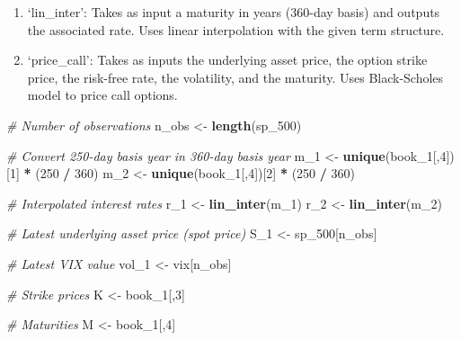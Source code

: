 \documentclass[]{article}
\newenvironment{Shaded}{\begin{snugshade}}{\end{snugshade}}
\newcommand{\CommentTok}[1]{\textcolor[rgb]{0.56,0.35,0.01}{\textit{#1}}}
\newcommand{\DecValTok}[1]{\textcolor[rgb]{0.00,0.00,0.81}{#1}}
\newcommand{\KeywordTok}[1]{\textcolor[rgb]{0.13,0.29,0.53}{\textbf{#1}}}
\newcommand{\NormalTok}[1]{#1}
\newcommand{\OperatorTok}[1]{\textcolor[rgb]{0.81,0.36,0.00}{\textbf{#1}}}
\newcommand{\StringTok}[1]{\textcolor[rgb]{0.31,0.60,0.02}{#1}}
\providecommand{\tightlist}{%
  \setlength{\itemsep}{0pt}\setlength{\parskip}{0pt}}
\begin{document}
\begin{enumerate}
\def\labelenumi{\arabic{enumi}.}
\tightlist
\item
  `lin\_inter': Takes as input a maturity in years (360-day basis) and
  outputs the associated rate. Uses linear interpolation with the given
  term structure.
\item
  `price\_call': Takes as inputs the underlying asset price, the option
  strike price, the risk-free rate, the volatility, and the maturity.
  Uses Black-Scholes model to price call options.
\end{enumerate}

\begin{Shaded}
\begin{Highlighting}[]
\CommentTok{# Number of observations}
\NormalTok{n_obs <-}\StringTok{ }\KeywordTok{length}\NormalTok{(sp_}\DecValTok{500}\NormalTok{)}

\CommentTok{# Convert 250-day basis year in 360-day basis year}
\NormalTok{m_}\DecValTok{1}\NormalTok{ <-}\StringTok{ }\KeywordTok{unique}\NormalTok{(book_}\DecValTok{1}\NormalTok{[,}\DecValTok{4}\NormalTok{])[}\DecValTok{1}\NormalTok{] }\OperatorTok{*}\StringTok{ }\NormalTok{(}\DecValTok{250} \OperatorTok{/}\StringTok{ }\DecValTok{360}\NormalTok{)}
\NormalTok{m_}\DecValTok{2}\NormalTok{ <-}\StringTok{ }\KeywordTok{unique}\NormalTok{(book_}\DecValTok{1}\NormalTok{[,}\DecValTok{4}\NormalTok{])[}\DecValTok{2}\NormalTok{] }\OperatorTok{*}\StringTok{ }\NormalTok{(}\DecValTok{250} \OperatorTok{/}\StringTok{ }\DecValTok{360}\NormalTok{)}

\CommentTok{# Interpolated interest rates}
\NormalTok{r_}\DecValTok{1}\NormalTok{ <-}\StringTok{ }\KeywordTok{lin_inter}\NormalTok{(m_}\DecValTok{1}\NormalTok{)}
\NormalTok{r_}\DecValTok{2}\NormalTok{ <-}\StringTok{ }\KeywordTok{lin_inter}\NormalTok{(m_}\DecValTok{2}\NormalTok{)}

\CommentTok{# Latest underlying asset price (spot price)}
\NormalTok{S_}\DecValTok{1}\NormalTok{ <-}\StringTok{ }\NormalTok{sp_}\DecValTok{500}\NormalTok{[n_obs]}

\CommentTok{# Latest VIX value}
\NormalTok{vol_}\DecValTok{1}\NormalTok{ <-}\StringTok{ }\NormalTok{vix[n_obs]}

\CommentTok{# Strike prices}
\NormalTok{K <-}\StringTok{ }\NormalTok{book_}\DecValTok{1}\NormalTok{[,}\DecValTok{3}\NormalTok{]}

\CommentTok{# Maturities}
\NormalTok{M <-}\StringTok{ }\NormalTok{book_}\DecValTok{1}\NormalTok{[,}\DecValTok{4}\NormalTok{]}


\end{Highlighting}
\end{Shaded}
\end{document}
